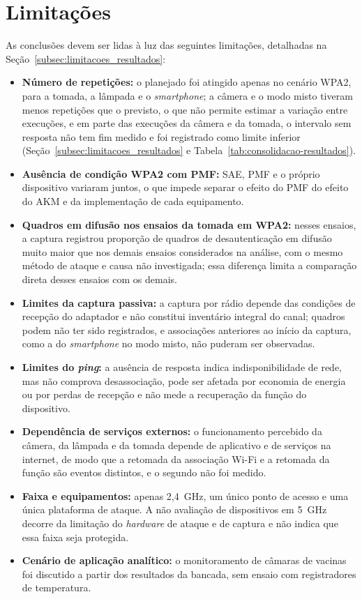 \section{Limitações}

As conclusões devem ser lidas à luz das seguintes limitações, detalhadas na Seção~\ref{subsec:limitacoes_resultados}:

\begin{itemize}
    \item \textbf{Número de repetições:} o planejado foi atingido apenas no cenário WPA2, para a tomada, a lâmpada e o \textit{smartphone}; a câmera e o modo misto tiveram menos repetições que o previsto, o que não permite estimar a variação entre execuções, e em parte das execuções da câmera e da tomada, o intervalo sem resposta não tem fim medido e foi registrado como limite inferior (Seção~\ref{subsec:limitacoes_resultados} e Tabela~\ref{tab:consolidacao-resultados}).
    \item \textbf{Ausência de condição WPA2 com PMF:} SAE, PMF e o próprio dispositivo variaram juntos, o que impede separar o efeito do PMF do efeito do AKM e da implementação de cada equipamento.
    \item \textbf{Quadros em difusão nos ensaios da tomada em WPA2:} nesses ensaios, a captura registrou proporção de quadros de desautenticação em difusão muito maior que nos demais ensaios considerados na análise, com o mesmo método de ataque e causa não investigada; essa diferença limita a comparação direta desses ensaios com os demais.
    \item \textbf{Limites da captura passiva:} a captura por rádio depende das condições de recepção do adaptador e não constitui inventário integral do canal; quadros podem não ter sido registrados, e associações anteriores ao início da captura, como a do \textit{smartphone} no modo misto, não puderam ser observadas.
    \item \textbf{Limites do \textit{ping}:} a ausência de resposta indica indisponibilidade de rede, mas não comprova desassociação, pode ser afetada por economia de energia ou por perdas de recepção e não mede a recuperação da função do dispositivo.
    \item \textbf{Dependência de serviços externos:} o funcionamento percebido da câmera, da lâmpada e da tomada depende de aplicativo e de serviços na internet, de modo que a retomada da associação Wi-Fi e a retomada da função são eventos distintos, e o segundo não foi medido.
    \item \textbf{Faixa e equipamentos:} apenas 2,4~GHz, um único ponto de acesso e uma única plataforma de ataque. A não avaliação de dispositivos em 5~GHz decorre da limitação do \textit{hardware} de ataque e de captura e não indica que essa faixa seja protegida.
    \item \textbf{Cenário de aplicação analítico:} o monitoramento de câmaras de vacinas foi discutido a partir dos resultados da bancada, sem ensaio com registradores de temperatura.
\end{itemize}

